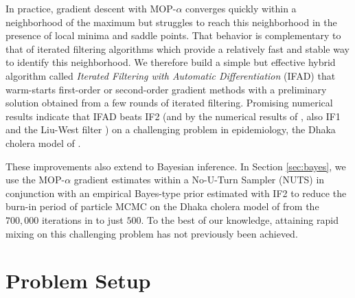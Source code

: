 \documentclass[numsec,webpdf,modern,medium,namedate]{oup-authoring-template}
\newcommand\arxiv[2]{#2} %
\theoremstyle{thmstyleone}%
\theoremstyle{thmstyletwo}%
\theoremstyle{thmstylethree}%
\begin{document}
In practice, gradient descent with MOP-$\alpha$ converges quickly within a neighborhood of the maximum but struggles to reach this neighborhood in the presence of local minima and saddle points.
That behavior is complementary to that of iterated filtering algorithms \citep{ionides06-pnas,ionides15} which provide a relatively fast and stable way to identify this neighborhood.
We therefore build a simple but effective hybrid algorithm called {\it Iterated Filtering with Automatic Differentiation} (IFAD) that warm-starts first-order or second-order gradient methods with a preliminary solution obtained from a few rounds of iterated filtering.
Promising numerical results indicate that IFAD beats IF2 (and by the numerical results of \cite{ionides15}, also IF1 \citep{ionides06-pnas,ionides11} and the Liu-West filter \citep{liuwest01}) on a challenging problem in epidemiology, the Dhaka cholera model of \cite{king08}.

These improvements also extend to Bayesian inference. In Section \ref{sec:bayes}, we use the MOP-$\alpha$ gradient estimates within a No-U-Turn Sampler (NUTS) \citep{homan14} in conjunction with an empirical Bayes-type prior estimated with IF2 to reduce the burn-in period of particle MCMC \citep{andrieu10} on the Dhaka cholera model of \cite{king08} from the $700,000$ iterations in \cite{fasiolo16} to just $500$. To the best of our knowledge, attaining rapid mixing on this challenging problem has not previously been achieved. 

\arxiv{}{\vspace*{-2mm}}
\section{Problem Setup}


\end{document}
